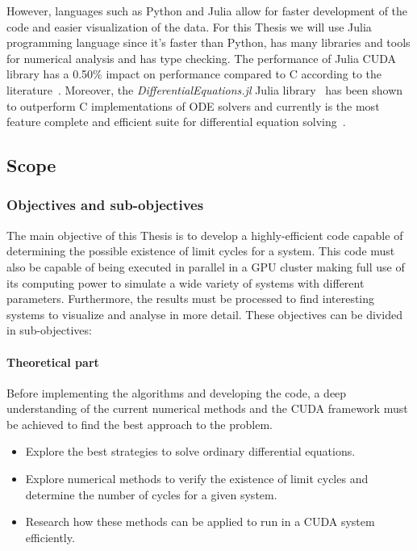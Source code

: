 However, languages such as Python and Julia allow for faster development of the
code and easier visualization of the data. For this Thesis we will use Julia
programming language since it's faster than Python, has many libraries and tools
for numerical analysis and has type checking. The performance of Julia CUDA
library has a 0.50\% impact on performance compared to C according to the
literature~\cite{besard_effective_2019}. Moreover, the
\emph{DifferentialEquations.jl} Julia
library~\cite{rackauckas_differentialequationsjl_2017} has been shown to
outperform C implementations of ODE solvers and currently is the most feature
complete and efficient suite for differential equation
solving~\cite{rackauckas_comparison_2017}.

\pagebreak
\subsection{Scope}
\subsubsection{Objectives and sub-objectives}

The main objective of this Thesis is to develop a highly-efficient code capable
of determining the possible existence of limit cycles for a system. This code
must also be capable of being executed in parallel in a GPU cluster making full
use of its computing power to simulate a wide variety of systems with different
parameters. Furthermore, the results must be processed to find interesting
systems to visualize and analyse in more detail. These objectives can be divided
in sub-objectives:

\paragraph{Theoretical part}

Before implementing the algorithms and developing the code, a deep understanding
of the current numerical methods and the CUDA framework must be achieved to find
the best approach to the problem.

\begin{itemize}
    \item Explore the best strategies to solve ordinary differential equations.
    \item Explore numerical methods to verify the existence of limit cycles and determine the number of cycles for a given system.
    \item Research how these methods can be applied to run in a CUDA system efficiently.
\end{itemize}

